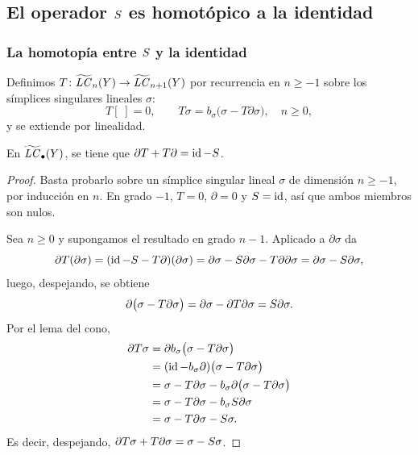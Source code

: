 \subsection{El operador $S$ es homotópico a la identidad}

\begin{frame}[allowframebreaks, t]
  \frametitle{La homotopía entre $S$ y la identidad}

  \begin{definition}
    Definimos $T\colon\widetilde{\mathit{LC}}_n(Y)\to\widetilde{\mathit{LC}}_{n+1}(Y)$ por
    recurrencia en $n\geq-1$ sobre los símplices singulares lineales
    $\sigma$:
    \[
      T[\;]=0,
      \qquad
      T\sigma=b_\sigma\bigl(\sigma-T\partial\sigma\bigr),\quad n\geq0,
    \]
    y se extiende por linealidad.
  \end{definition}

  \begin{proposition}
    En $\widetilde{\mathit{LC}}_\bullet(Y)$, se tiene que $\partial T+T\partial=\operatorname{id}-S$.
  \end{proposition}

  \begin{proof}
    Basta probarlo sobre un símplice singular lineal $\sigma$ de dimensión
    $n\geq-1$, por inducción en $n$. En grado $-1$, $T=0$, $\partial=0$ y
    $S=\operatorname{id}$, así que ambos miembros son nulos.

    \framebreak

    Sea $n\geq0$ y supongamos el resultado en grado $n-1$. Aplicado a
    $\partial\sigma$ da
    \[
      \partial T(\partial\sigma)
      =(\operatorname{id}-S-T\partial)(\partial\sigma)
      =\partial\sigma-S\partial\sigma-T\partial\partial\sigma
      =\partial\sigma-S\partial\sigma,
    \]
    luego, despejando, se obtiene
    \[
      \partial\bigl(\sigma-T\partial\sigma\bigr)
      =\partial\sigma-\partial T\partial\sigma
      =S\partial\sigma.
    \]
    Por el lema del cono,
    \begin{align*}
      \partial T\sigma
      &=\partial b_\sigma\bigl(\sigma-T\partial\sigma\bigr)\\
      &=(\operatorname{id} - b_\sigma\partial)\bigl(\sigma-T\partial\sigma\bigr)\\
      &=\sigma-T\partial\sigma
        -b_\sigma\partial\bigl(\sigma-T\partial\sigma\bigr)\\
      &=\sigma-T\partial\sigma-b_\sigma S\partial\sigma\\
      &=\sigma-T\partial\sigma-S\sigma.
    \end{align*}
    Es decir, despejando, $\partial T\sigma+T\partial\sigma=\sigma-S\sigma$.
  \end{proof}
\end{frame}



